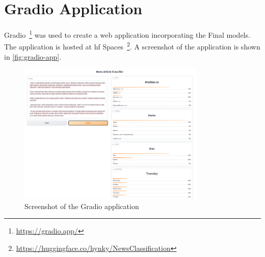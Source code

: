 \chapter{Gradio Application}
\label{chap:gradio-app}
Gradio~\footnote{\url{https://gradio.app/}}
was used to create a web application incorporating the Final models.
The application is hosted at \ac{hf} Spaces~\footnote{\url{https://huggingface.co/hynky/NewsClassification}}.
A screenshot of the application is shown in \autoref{fig:gradio-app}.

\begin{figure}[ht]
    \centering
    \includegraphics[width=0.8\textwidth]{img/gradio/gradio.png}
    \caption{Screenshot of the Gradio application}
    \label{fig:gradio-app}
\end{figure}
